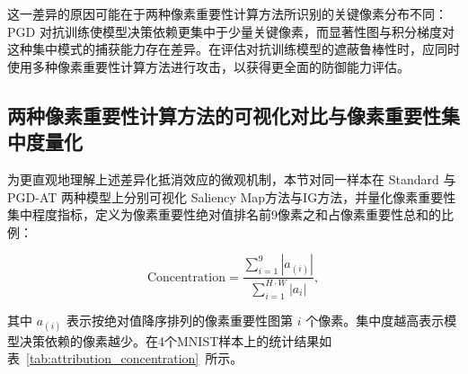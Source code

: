 这一差异的原因可能在于两种像素重要性计算方法所识别的关键像素分布不同：PGD 对抗训练使模型决策依赖更集中于少量关键像素，而显著性图与积分梯度对这种集中模式的捕获能力存在差异。在评估对抗训练模型的遮蔽鲁棒性时，应同时使用多种像素重要性计算方法进行攻击，以获得更全面的防御能力评估。

\begin{table}[htbp]
  \centering
  \caption{遮蔽攻击与梯度攻击的相互抵消趋势（准确率\%）}
  \label{tab:cancel}
\end{table}

\subsection{两种像素重要性计算方法的可视化对比与像素重要性集中度量化} \label{sec:saliency_vs_ig}

为更直观地理解上述差异化抵消效应的微观机制，本节对同一样本在 Standard 与 PGD-AT 两种模型上分别可视化 Saliency Map方法与IG方法，并量化像素重要性集中程度指标，定义为像素重要性绝对值排名前9像素之和占像素重要性总和的比例：

\begin{equation}
  \text{Concentration} = \frac{\sum_{i=1}^{9} |a_{(i)}|}{\sum_{i=1}^{H\cdot W} |a_i|},
\end{equation}

其中 $a_{(i)}$ 表示按绝对值降序排列的像素重要性图第 $i$ 个像素。集中度越高表示模型决策依赖的像素越少。在4个MNIST样本上的统计结果如表~\ref{tab:attribution_concentration}~所示。

